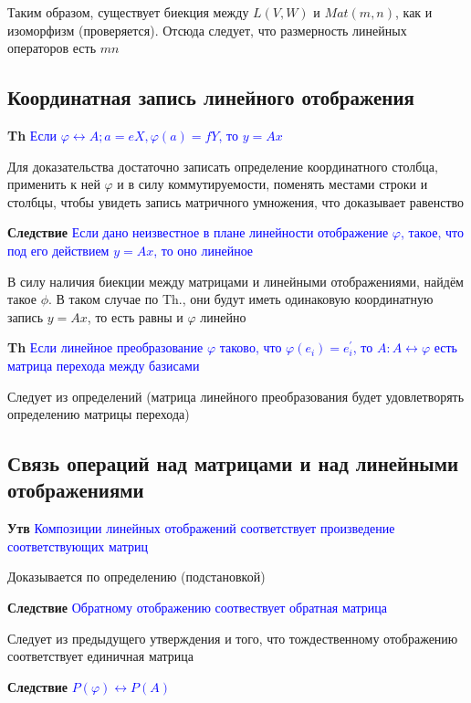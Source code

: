 \documentclass[a4paper, 14pt]{article}
\begin{document}
    Таким образом, существует биекция между $L(V, W)$ и $Mat(m, n)$, как и изоморфизм (проверяется).
    Отсюда следует, что размерность линейных операторов есть $mn$

    \subsection{Координатная запись линейного отображения}

    \textbf{Th} \textcolor{blue}{Если $\varphi \leftrightarrow A; a = eX, \varphi(a) = fY$, то $y = Ax$}

    Для доказательства достаточно записать определение координатного столбца, применить к ней $\varphi$ и в силу
    коммутируемости, поменять местами строки и столбцы, чтобы увидеть запись матричного умножения, что доказывает
    равенство

    \textbf{Следствие} \textcolor{blue}{Если дано неизвестное в плане линейности отображение $\varphi$, такое, что под
    его действием $y = Ax$, то оно линейное}

    В силу наличия биекции между матрицами и линейными отображениями, найдём такое $\phi$.
    В таком случае по Th., они будут иметь одинаковую координатную запись $y = Ax$, то есть равны и $\varphi$ линейно

    \textbf{Th} \textcolor{blue}{Если линейное преобразование $\varphi$ таково, что $\varphi(e_i) = e_i^{'}$, то
        $A: A \leftrightarrow \varphi$ есть матрица перехода между базисами}

    Следует из определений (матрица линейного преобразования будет удовлетворять определению матрицы перехода)

    \subsection{Связь операций над матрицами и над линейными отображениями}

    \textbf{Утв} \textcolor{blue}{Композиции линейных отображений соответствует произведение соответствующих матриц}

    Доказывается по определению (подстановкой)

    \textbf{Следствие} \textcolor{blue}{Обратному отображению соотвествует обратная матрица}

    Следует из предыдущего утверждения и того, что тождественному отображению соответствует единичная матрица

    \textbf{Следствие} \textcolor{blue}{$P(\varphi) \leftrightarrow P(A)$}
\end{document}
